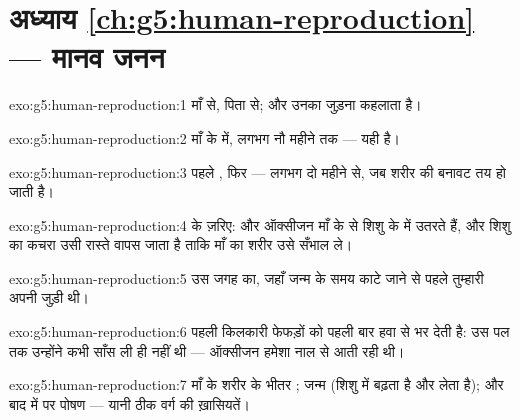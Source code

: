 \section*{अध्याय \ref{ch:g5:human-reproduction} --- मानव जनन}

\begin{solution}{exo:g5:human-reproduction:1}
 माँ से,  पिता से; और उनका जुड़ना  कहलाता है।
\end{solution}

\begin{solution}{exo:g5:human-reproduction:2}
माँ के  में, लगभग नौ महीने तक --- यही  है।
\end{solution}

\begin{solution}{exo:g5:human-reproduction:3}
पहले , फिर  --- लगभग दो महीने से, जब शरीर की बनावट
तय हो जाती है।
\end{solution}

\begin{solution}{exo:g5:human-reproduction:4}
 के ज़रिए:  और ऑक्सीजन माँ के  से शिशु के 
में उतरते हैं, और शिशु का कचरा उसी रास्ते वापस जाता है ताकि माँ का
शरीर उसे सँभाल ले।
\end{solution}

\begin{solution}{exo:g5:human-reproduction:5}
उस जगह का, जहाँ जन्म के समय काटे जाने से पहले तुम्हारी अपनी 
जुड़ी थी।
\end{solution}

\begin{solution}{exo:g5:human-reproduction:6}
पहली किलकारी फेफड़ों को पहली बार हवा से भर देती है: उस पल तक उन्होंने
कभी साँस ली ही नहीं थी --- ऑक्सीजन हमेशा नाल से आती रही थी।
\end{solution}

\begin{solution}{exo:g5:human-reproduction:7}
माँ के शरीर के भीतर ;  जन्म (शिशु  में बढ़ता है और
 लेता है); और बाद में  पर पोषण --- यानी ठीक  वर्ग
की ख़ासियतें।
\end{solution}

